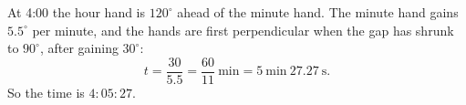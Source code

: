 At 4:00 the hour hand is $120^\circ$ ahead of the minute hand. The minute hand gains $5.5^\circ$ per minute, and the hands are first perpendicular when the gap has shrunk to $90^\circ$, after gaining $30^\circ$:
\[t=\dfrac{30}{5.5}=\dfrac{60}{11}\ \text{min}=5\ \text{min}\ 27.27\ \text{s}.\]
So the time is $\boxed{4{:}05{:}27}$.
